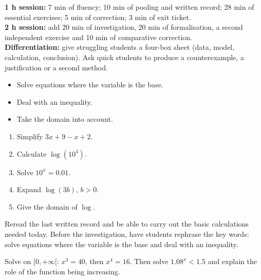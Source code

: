 \ifprof
\begin{methode}
\textbf{1 h session:} 7 min of fluency; 10 min of pooling and written record; 28 min of essential exercises; 5 min of correction; 3 min of exit ticket.\\
\textbf{2 h session:} add 20 min of investigation, 20 min of formalisation, a second independent exercise and 10 min of comparative correction.\\
\textbf{Differentiation:} give struggling students a four-box sheet (data, model, calculation, conclusion). Ask quick students to produce a counterexample, a justification or a second method.
\end{methode}
\fi
{}
\begin{objectifs}\begin{itemize}\item Solve equations where the variable is the base.\item Deal with an inequality.\item Take the domain into account.\end{itemize}\end{objectifs}
\begin{automatismes}\begin{enumerate}\item Simplify $3x+9-x+2$. \item Calculate $\log(10^4)$. \item Solve $10^x=0.01$. \item Expand $\log(3b)$, $b>0$. \item Give the domain of $\log$. \rep{$]0,+\infty[$}\end{enumerate}\end{automatismes}
\begin{prerequis}Reread the last written record and be able to carry out the basic calculations needed today. Before the investigation, have students rephrase the key words: solve equations where the variable is the base and deal with an inequality.\end{prerequis}

\begin{activite}
Solve on $[0,+\infty[$: $x^3=40$, then $x^4=16$. Then solve $1.08^x<1.5$ and explain the role of the function being increasing.

\end{activite}

